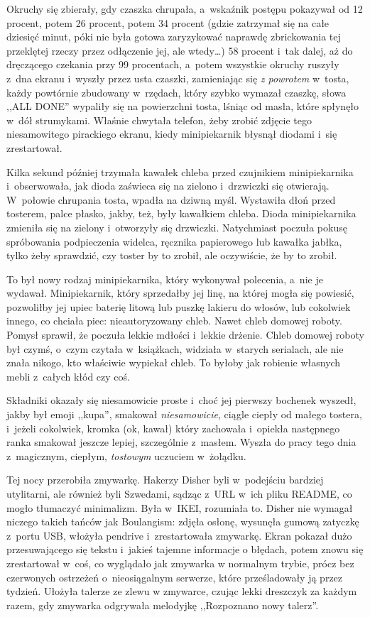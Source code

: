 \documentclass[oneside,polish,11pt,sfheadings]{mwbk}
\begin{document}
Okruchy się zbierały, gdy czaszka chrupała, a~wskaźnik postępu pokazywał
od 12 procent, potem 26 procent, potem 34 procent (gdzie zatrzymał się
na całe dziesięć minut, póki nie była gotowa zaryzykować naprawdę
zbrickowania tej przeklętej rzeczy przez odłączenie jej, ale wtedy\ldots )
58 procent i~tak dalej, aż do dręczącego czekania przy 99 procentach, a~potem wszystkie okruchy ruszyły z~dna ekranu i~wyszły przez usta
czaszki, zamieniając się \textit{z powrotem} w~tosta, każdy powtórnie
zbudowany w~rzędach, który szybko wymazał czaszkę, słowa ,,ALL DONE''
wypaliły się na powierzchni tosta, lśniąc od masła, które spłynęło w~dół
strumykami. Właśnie chwytała telefon, żeby zrobić zdjęcie tego
niesamowitego pirackiego ekranu, kiedy minipiekarnik błysnął diodami i~się zrestartował.

Kilka sekund później trzymała kawałek chleba przed czujnikiem
minipiekarnika i~obserwowała, jak dioda zaświeca się na zielono i~drzwiczki się otwierają. W~połowie chrupania tosta, wpadła na dziwną
myśl. Wystawiła dłoń przed tosterem, palce płasko, jakby, też, były
kawałkiem chleba. Dioda minipiekarnika zmieniła się na zielony i~otworzyły się drzwiczki. Natychmiast poczuła pokusę spróbowania
podpieczenia widelca, ręcznika papierowego lub kawałka jabłka, tylko
żeby sprawdzić, czy toster by to zrobił, ale oczywiście, że by to
zrobił.

To był nowy rodzaj minipiekarnika, który wykonywał polecenia, a~nie je
wydawał. Minipiekarnik, który sprzedałby jej linę, na której mogła się
powiesić, pozwoliłby jej upiec baterię litową lub puszkę lakieru do
włosów, lub cokolwiek innego, co chciała piec: nieautoryzowany chleb.
Nawet chleb domowej roboty. Pomysł sprawił, że poczuła lekkie mdłości i~lekkie drżenie. Chleb domowej roboty był czymś, o~czym czytała w~książkach, widziała w~starych serialach, ale nie znała nikogo, kto
właściwie wypiekał chleb. To byłoby jak robienie własnych mebli z~całych
kłód czy coś.

Składniki okazały się niesamowicie proste i~choć jej pierwszy bochenek
wyszedł, jakby był emoji ,,kupa'', smakował \textit{niesamowicie}, ciągle
ciepły od małego tostera, i~jeżeli cokolwiek, kromka (ok, kawał) który
zachowała i~opiekła następnego ranka smakował jeszcze lepiej,
szczególnie z~masłem. Wyszła do pracy tego dnia z~magicznym, ciepłym,
\textit{tostowym} uczuciem w~żołądku.

Tej nocy przerobiła zmywarkę. Hakerzy Disher byli w~podejściu bardziej
utylitarni, ale również byli Szwedami, sądząc z~URL w~ich pliku README,
co mogło tłumaczyć minimalizm. Była w~IKEI, rozumiała to. Disher nie
wymagał niczego takich tańców jak Boulangism: zdjęła osłonę, wysunęła
gumową zatyczkę z~portu USB, włożyła pendrive i~zrestartowała zmywarkę.
Ekran pokazał dużo przesuwającego się tekstu i~jakieś tajemne informacje
o błędach, potem znowu się zrestartował w~coś, co wyglądało jak zmywarka
w normalnym trybie, prócz bez czerwonych ostrzeżeń o~nieosiągalnym
serwerze, które prześladowały ją przez tydzień. Ułożyła talerze ze zlewu
w zmywarce, czując lekki dreszczyk za każdym razem, gdy zmywarka
odgrywała melodyjkę ,,Rozpoznano nowy talerz''.
\end{document}
